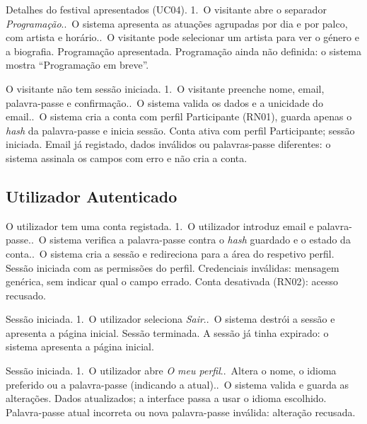 {Detalhes do festival apresentados (UC04).}
{1.~O visitante abre o separador \emph{Programação}..~O sistema apresenta as atuações agrupadas por dia e por palco, com
 artista e horário..~O visitante pode selecionar um artista para ver o género e a biografia.}
{Programação apresentada.}
{Programação ainda não definida: o sistema mostra ``Programação em breve''.}

{O visitante não tem sessão iniciada.}
{1.~O visitante preenche nome, email, palavra-passe e confirmação..~O sistema valida os dados e a unicidade do email..~O sistema cria a conta com perfil Participante (RN01), guarda apenas o
 \emph{hash} da palavra-passe e inicia sessão.}
{Conta ativa com perfil Participante; sessão iniciada.}
{Email já registado, dados inválidos ou palavras-passe diferentes: o sistema
 assinala os campos com erro e não cria a conta.}

\subsection{Utilizador Autenticado}

{O utilizador tem uma conta registada.}
{1.~O utilizador introduz email e palavra-passe..~O sistema verifica a palavra-passe contra o \emph{hash} guardado e o
 estado da conta..~O sistema cria a sessão e redireciona para a área do respetivo perfil.}
{Sessão iniciada com as permissões do perfil.}
{Credenciais inválidas: mensagem genérica, sem indicar qual o campo errado.
 Conta desativada (RN02): acesso recusado.}

{Sessão iniciada.}
{1.~O utilizador seleciona \emph{Sair}..~O sistema destrói a sessão e apresenta a página inicial.}
{Sessão terminada.}
{A sessão já tinha expirado: o sistema apresenta a página inicial.}

{Sessão iniciada.}
{1.~O utilizador abre \emph{O meu perfil}..~Altera o nome, o idioma preferido ou a palavra-passe (indicando a
 atual)..~O sistema valida e guarda as alterações.}
{Dados atualizados; a interface passa a usar o idioma escolhido.}
{Palavra-passe atual incorreta ou nova palavra-passe inválida: alteração
 recusada.}

